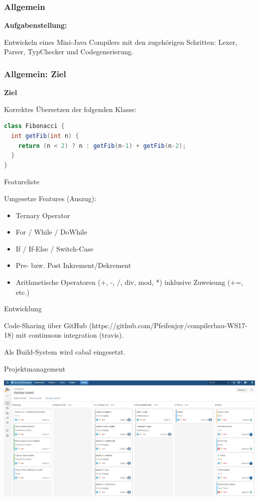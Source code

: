 \begin{frame}
	\frametitle{Allgemein}
	
\textbf{Aufgabenstellung:}

Entwickeln eines Mini-Java Compilers mit den zugehörigen Schritten: Lexer, Parser, TypChecker und Codegenerierung.
\end{frame}

\begin{frame}[fragile]
\frametitle{Allgemein: Ziel}

\textbf{Ziel} 

Korrektes Übersetzen der folgenden Klasse:

\begin{lstlisting}[language=Java]
class Fibonacci {
  int getFib(int n) {
    return (n < 2) ? n : getFib(n-1) + getFib(n-2);
  }
}
\end{lstlisting}	
\end{frame}



\begin{frame}{Featureliste}

Umgesetze Features (Auszug):

\begin{itemize}
	\item Ternary Operator
	\item For / While / DoWhile 
	\item If / If-Else / Switch-Case
	\item Pre- bzw. Post Inkrement/Dekrement
	\item Arithmetische Operatoren (+, -, /, div, mod, *) inklusive Zuweisung (+=, etc.)
\end{itemize}	
\end{frame}

\begin{frame}{Entwicklung}

Code-Sharing über GitHub (https://github.com/Pfeifenjoy/compilerbau-WS17-18) mit continuous integration (travis).

\par \medskip

Als Build-System wird cabal eingesetzt.	
\end{frame}

\begin{frame}{Projektmanagement}

\includegraphics[scale=0.25]{images/jira.jpg}

\end{frame}
